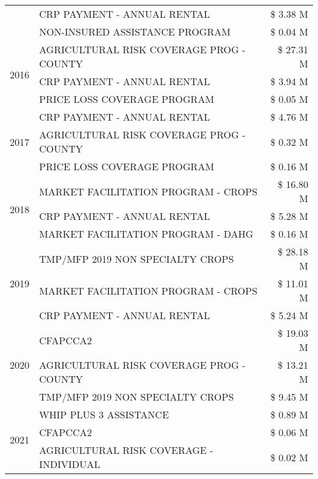 \begin{tabular}{llr}
 & CRP PAYMENT - ANNUAL RENTAL & \$ 3.38 M \\
 & NON-INSURED ASSISTANCE PROGRAM & \$ 0.04 M \\
\cline{1-3}
\multirow[t]{3}{*}{2016} & AGRICULTURAL RISK COVERAGE PROG - COUNTY      & \$ 27.31 M \\
 & CRP PAYMENT - ANNUAL RENTAL                   & \$ 3.94 M \\
 & PRICE LOSS COVERAGE PROGRAM                   & \$ 0.05 M \\
\cline{1-3}
\multirow[t]{3}{*}{2017} & CRP PAYMENT - ANNUAL RENTAL & \$ 4.76 M \\
 & AGRICULTURAL RISK COVERAGE PROG - COUNTY & \$ 0.32 M \\
 & PRICE LOSS COVERAGE PROGRAM & \$ 0.16 M \\
\cline{1-3}
\multirow[t]{3}{*}{2018} & MARKET FACILITATION PROGRAM - CROPS & \$ 16.80 M \\
 & CRP PAYMENT - ANNUAL RENTAL & \$ 5.28 M \\
 & MARKET FACILITATION PROGRAM - DAHG & \$ 0.16 M \\
\cline{1-3}
\multirow[t]{3}{*}{2019} & TMP/MFP 2019 NON SPECIALTY CROPS & \$ 28.18 M \\
 & MARKET FACILITATION PROGRAM - CROPS & \$ 11.01 M \\
 & CRP PAYMENT - ANNUAL RENTAL & \$ 5.24 M \\
\cline{1-3}
\multirow[t]{3}{*}{2020} & CFAPCCA2 & \$ 19.03 M \\
 & AGRICULTURAL RISK COVERAGE PROG - COUNTY & \$ 13.21 M \\
 & TMP/MFP 2019 NON SPECIALTY CROPS & \$ 9.45 M \\
\cline{1-3}
\multirow[t]{3}{*}{2021} & WHIP PLUS 3 ASSISTANCE & \$ 0.89 M \\
 & CFAPCCA2 & \$ 0.06 M \\
 & AGRICULTURAL RISK COVERAGE - INDIVIDUAL & \$ 0.02 M \\
\cline{1-3}
\bottomrule
\end{tabular}
